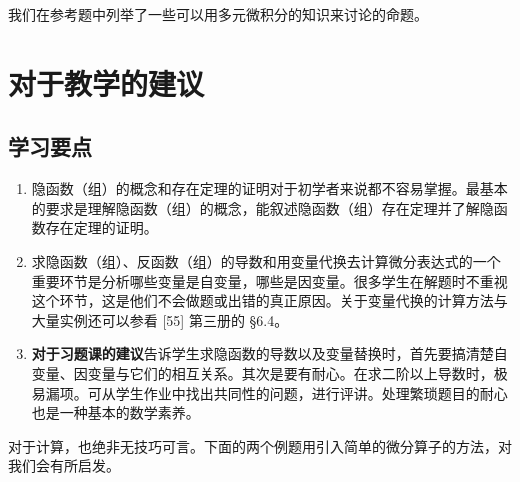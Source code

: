 我们在参考题中列举了一些可以用多元微积分的知识来讨论的命题。

\section{对于教学的建议}

\subsection{学习要点}

\begin{enumerate}
  \item 隐函数（组）的概念和存在定理的证明对于初学者来说都不容易掌握。最基本的要求是理解隐函数（组）的概念，能叙述隐函数（组）存在定理并了解隐函数存在定理的证明。
  \item 求隐函数（组）、反函数（组）的导数和用变量代换去计算微分表达式的一个重要环节是分析哪些变量是自变量，哪些是因变量。很多学生在解题时不重视这个环节，这是他们不会做题或出错的真正原因。关于变量代换的计算方法与大量实例还可以参看 [55] 第三册的 §6.4。
  \item \textbf{对于习题课的建议}\quad 告诉学生求隐函数的导数以及变量替换时，首先要搞清楚自变量、因变量与它们的相互关系。其次是要有耐心。在求二阶以上导数时，极易漏项。可从学生作业中找出共同性的问题，进行评讲。处理繁琐题目的耐心也是一种基本的数学素养。
\end{enumerate}

对于计算，也绝非无技巧可言。下面的两个例题用引入简单的微分算子的方法，对我们会有所启发。

